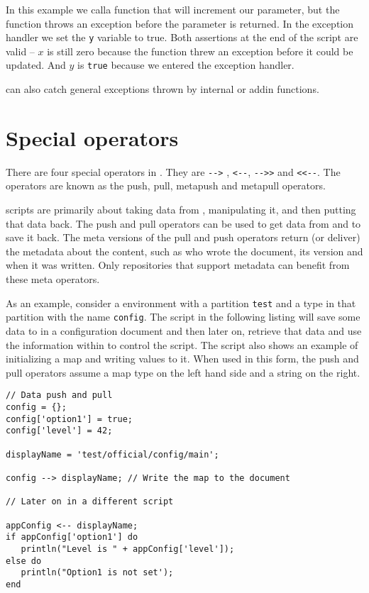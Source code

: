 In this example we calla function that will increment our parameter, but the function throws an exception before the parameter is returned. In the exception handler we set the \Verb+y+ variable to true. Both assertions at the end of the script are valid -- $x$ is still zero because the function threw an exception before it could be updated. And $y$ is \verb+true+ because we entered the exception handler.

\Reflex can also catch general exceptions thrown by internal or addin functions.

\chapter{Special operators}
There are four special operators in \Reflex. They are \Verb+-->+ , \verb+<--+, \verb+-->>+ and \verb+<<--+. The operators are known as the push, pull, metapush and metapull operators. 

\Reflex scripts are primarily about taking data from \Rapture, manipulating it, and then putting that data back. The push and pull operators can be used to get data from \Rapture and to save it back. The meta versions of the pull and push operators return (or deliver) the metadata about the content, such as who wrote the document, its version and when it was written. Only repositories that support metadata can benefit from these meta operators.

As an example, consider a \Rapture environment with a partition \Verb+test+ and a type in that partition with the name \verb+config+. The script in the following listing will save some data to \Rapture in a configuration document and then later on, retrieve that data and use the information within to control the script. The script also shows an example of initializing a map and writing values to it. When used in this form, the push and pull operators assume a map type on the left hand side and a string on the right.

\begin{lstlisting}[caption={Push and Pull}]
// Data push and pull
config = {};
config['option1'] = true;
config['level'] = 42;

displayName = 'test/official/config/main';

config --> displayName; // Write the map to the document

// Later on in a different script

appConfig <-- displayName;
if appConfig['option1'] do
   println("Level is " + appConfig['level']);
else do
   println("Option1 is not set');
end
\end{lstlisting}

